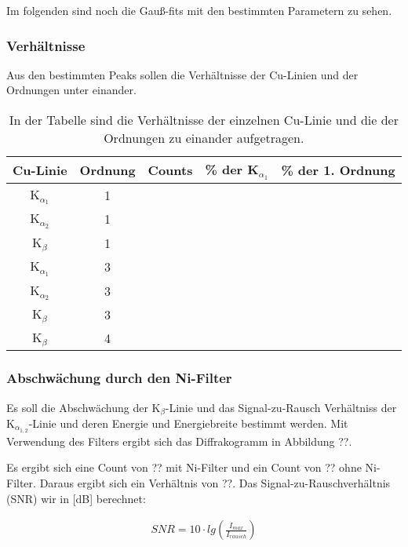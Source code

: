 
Im folgenden sind noch die Gau\ss -fits mit den bestimmten Parametern zu sehen.


\subsubsection{Verh\"altnisse}
Aus den bestimmten Peaks sollen die Verh\"altnisse der Cu-Linien und der Ordnungen unter einander.

\begin{table}[H]
\caption{In der Tabelle sind die Verh\"altnisse der einzelnen Cu-Linie und die der Ordnungen zu einander aufgetragen.}
\label{tab:verhaeltnisse}
\centering
\begin{tabular}{|c|c|c|c|c|}
\hline Cu-Linie & Ordnung & Counts & \% der K$_{\alpha_1}$ & \% der 1. Ordnung \\ 
\hline K$_{\alpha_1}$ & 1 &  &  &  \\ 
\hline K$_{\alpha_2}$ & 1 &  &  &  \\ 
\hline K$_\beta$ & 1 &  &  &  \\ 
\hline K$_{\alpha_1}$ & 3 &  &  &  \\ 
\hline K$_{\alpha_2}$ & 3 &  &  &  \\ 
\hline K$_\beta$ & 3 &  &  &  \\ 
\hline K$_\beta$ & 4 &  &  &  \\ 
\hline 
\end{tabular} 
\end{table}


\subsubsection{Abschwächung durch den Ni-Filter}
Es soll die Abschwächung der K$_\beta$-Linie und das Signal-zu-Rausch Verhältniss der K$_{\alpha_{1,2}}$-Linie und deren Energie und Energiebreite bestimmt werden.
Mit Verwendung des Filters ergibt sich das Diffrakogramm in Abbildung ??.


Es ergibt sich eine Count von ?? mit Ni-Filter und ein Count von ?? ohne Ni-Filter. Daraus ergibt sich ein Verhältnis von ??.
Das Signal-zu-Rauschverhältnis (SNR) wir in [dB] berechnet:

\begin{align}
SNR = 10 \cdot lg \left( \frac{I_{max}}{I_{rausch}} \right)
\end{align}





